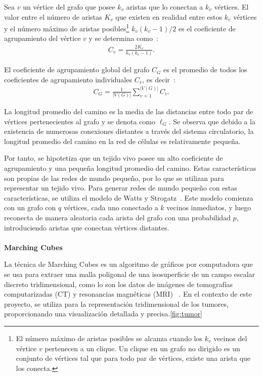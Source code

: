 \documentclass[a4paper,11pt]{article}
\begin{document}
{Sea $v$ un v\'ertice del grafo que posee $k_v$ aristas que lo conectan a $k_v$ v\'ertices. El valor entre el n\'umero de aristas $K_v$ que existen en realidad entre estos $k_v$ v\'ertices y el n\'umero m\'aximo de aristas posibles\footnote{El n\'umero m\'aximo de aristas posibles se alcanza cuando los $k_v$ vecinos del v\'ertice $v$ pertenecen a un clique. Un clique en un grafo no dirigido es un conjunto de v\'ertices tal que para todo par de v\'ertices, existe una arista que los conecta.} $k_v(k_v-1)/2$ es el coeficiente de agrupamiento del v\'ertice $v$ y se determina como~\cite{7}:
\begin{align}
C_v = \displaystyle\frac{2K_v}{k_v(k_v-1)}. \label{eq-clustering}
\end{align}

El coeficiente de agrupamiento global del grafo $C_G$ es el promedio de todos los coeficientes de agrupamiento individuales $C_v$, es decir~\cite{7}:
\begin{align}
C_G = \displaystyle\frac{1}{|V(G)|}\sum _{v=1} ^{|V(G)|} C_v. \label{eq-global-clustering}
\end{align}

La longitud promedio del camino es la media de las distancias entre todo par de v\'ertices pertenecientes al grafo y se denota como $\ell_G$. Se observa que debido a la existencia de numerosas conexiones distantes a través del sistema circulatorio, la longitud promedio del camino en la red de células es relativamente pequeña.

Por tanto, se hipotetiza que un tejido vivo posee un alto coeficiente de agrupamiento y una pequeña longitud promedio del camino. Estas características son propias de las redes de mundo pequeño, por lo que se utilizan para representar un tejido vivo. Para generar redes de mundo pequeño con estas características, se utiliza el modelo de Watts y Strogatz~\cite{9}. Este modelo comienza con un grafo con $q$ vértices, cada uno conectado a $k$ vecinos inmediatos, y luego reconecta de manera aleatoria cada arista del grafo con una probabilidad $p$, introduciendo aristas que conectan vértices distantes.\\
\\
\textbf{Marching Cubes}

La técnica de Marching Cubes es un algoritmo de gráficos por computadora que se usa para extraer una malla poligonal de una isosuperficie de un campo escalar discreto tridimensional, como lo son los datos de imágenes de tomografías computarizadas (CT) y resonancias magnéticas (MRI) ~\cite{5}. En el contexto de este proyecto, se utiliza para la representación tridimensional de los tumores, proporcionando una visualización detallada y precisa.\ref{fig:tumor}

}
\end{document}
